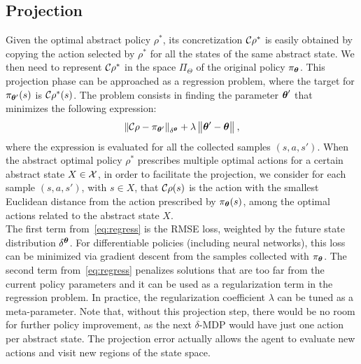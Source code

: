 \subsection{Projection} \label{subsec:proj}
Given the optimal abstract policy $\rho^*$, its concretization $\Conc\rho^*$ is easily obtained by copying the action selected by $\rho^{*}$ for all the states of the same abstract state. We then need to represent $\Conc\rho^{*}$ in the space $\Pi_{\Theta}$ of the original policy $\pi_{\vtheta}$. This projection phase can be approached as a regression problem, where the target for $\pi_{\vtheta'}(s)$ is $\Conc\rho^*(s)$. The problem consists in finding the parameter $\vtheta'$ that minimizes the following expression:
\begin{align}\label{eq:regress}
\norm[\delta^{\vtheta}]{\Conc\rho - \pi_{\vtheta'}} 
+ \lambda\norm{\vtheta'-\vtheta},
\end{align} 
where the expression is evaluated for all the collected samples $(s,a,s')$. 
When the abstract optimal policy $\rho^{*}$ prescribes multiple optimal actions for a certain abstract state $X \in \Xspace$, in order to facilitate the projection, we consider for each sample $(s,a,s')$, with $s \in X$, that $\Conc\rho(s)$ is the action with the smallest Euclidean distance from the action prescribed by $\pi_{\vtheta}(s)$, among the optimal actions related to the abstract state $X$.\\
\newline
The first term from~\eqref{eq:regress} is the \acf{RMSE} loss, weighted by the future state distribution $\delta^{\vtheta}$. For differentiable policies (including neural networks), this loss can be minimized via gradient descent from the samples collected with $\pi_{\vtheta}$. The second term from~\eqref{eq:regress} penalizes solutions that are too far from the current policy parameters and it can be used as a regularization term in the regression problem. In practice, the regularization coefficient $\lambda$ can be tuned as a meta-parameter. Note that, without this projection step, there would be no room for further policy improvement, as the next $\delta$-\ac{MDP} would have just one action per abstract state. The projection error actually allows the agent to evaluate new actions and visit new regions of the state space. 

